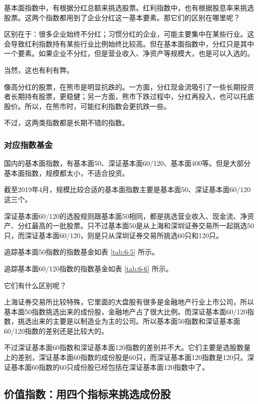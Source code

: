 基本面指数中，有根据分红总额来挑选股票。红利指数中，也有根据股息率来挑选股票。这两个指数都用到了企业分红这一基本要素。那它们的区别在哪里呢？

区别在于：很多企业始终不分红；习惯分红的企业，可能主要集中在某些行业。这会导致红利指数持有某些行业比例始终比较高。但在基本面指数中，分红只是其中一个要素。如果企业不分红，但是营业收入、净资产等规模大，也是可以入选的。

当然，这也有利有弊。

像高分红的股票，在熊市是明显抗跌的。一方面，分红现金流吸引了一些长期投资者长期持有股票，更稳健；另一方面，熊市下跌过程中，分红再投入，也可以托底股价。所以，在熊市时，可能红利指数会更抗跌一些。

不过，这两类指数都是长期不错的指数。

\subsubsection{对应指数基金}

国内的基本面指数，有基本面50、深证基本面60/120、基本面400等。但是大部分基本面指数，规模都太小，不适合投资。

截至2019年4月，规模比较合适的基本面指数主要是基本面50、深证基本面60/120这三个。

深证基本面60/120的选股规则跟基本面50相同，都是挑选营业收入、现金流、净资产、分红最高的一批股票。只不过基本面50是从上海和深圳证券交易所一起挑选50只，而深证基本面60/120，则是只从深圳证券交易所挑选60只和120只。

追踪基本面50指数的指数基金如表 \ref{tab:6-5} 所示。



追踪基本面60/120指数的指数基金如表 \ref{tab:6-6} 所示。



它们有什么区别呢？

上海证券交易所比较特殊，它里面的大盘股有很多是金融地产行业上市公司，所以基本面50指数挑选出来的成份股，金融地产占了很大比例。而深证基本面60/120指数，挑选出来的主要是以制造业为主的公司。所以基本面50指数和深证基本面60/120指数的差别还是比较大的。

不过深证基本面60指数和深证基本面120指数的差别并不大。它们主要是选股数量上的差别，深证基本面60指数的成份股是60只，而深证基本面120指数是120只。深证基本面60指数的60只成份股已经包括在深证基本面120指数中了。

\subsection{价值指数：用四个指标来挑选成份股}

